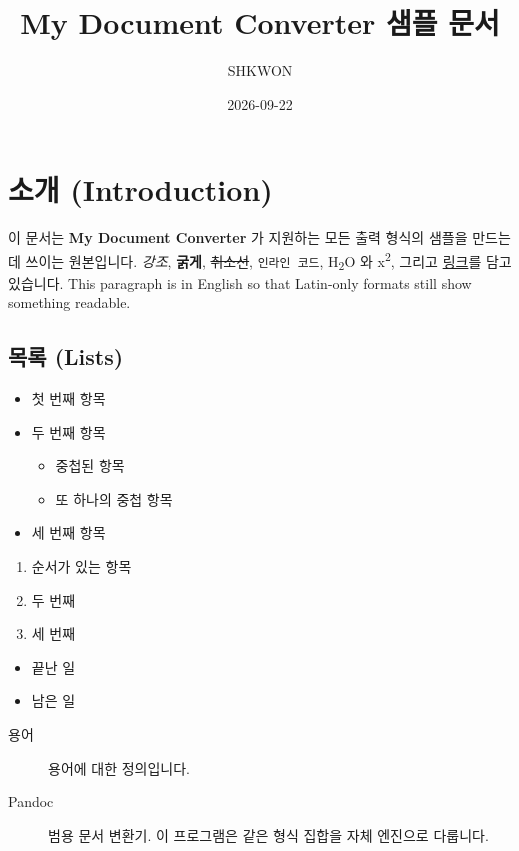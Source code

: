 \documentclass[11pt]{article}
\title{My Document Converter 샘플 문서}
\author{SHKWON}
\date{2026-09-22}
\begin{document}
\maketitle

\section*{소개 (Introduction)}\label{소개-introduction}

이 문서는 \textbf{My Document Converter} 가 지원하는 모든 출력 형식의 샘플을 만드는 데 쓰이는
원본입니다. \emph{강조}, \textbf{굵게}, \sout{취소선}, \verb|인라인 코드|,
H\textsubscript{2}O 와 x\textsuperscript{2}, 그리고
\href{https://example.com}{링크}를 담고 있습니다. This paragraph is in English so
that Latin-only formats still show something readable.

\subsection*{목록 (Lists)}\label{목록-lists}

\begin{itemize}
\item 첫 번째 항목
\item 두 번째 항목
\begin{itemize}
\item 중첩된 항목
\item 또 하나의 중첩 항목
\end{itemize}
\item 세 번째 항목
\end{itemize}

\begin{enumerate}
\item 순서가 있는 항목
\item 두 번째
\item 세 번째
\end{enumerate}

\begin{itemize}
\item 끝난 일
\item 남은 일
\end{itemize}

\begin{description}
\item[용어] 용어에 대한 정의입니다.
\item[Pandoc] 범용 문서 변환기. 이 프로그램은 같은 형식 집합을 자체 엔진으로 다룹니다.
\end{description}
\end{document}

